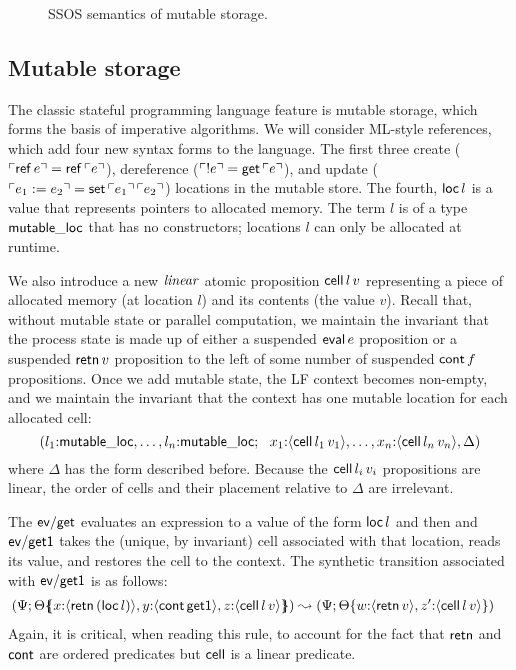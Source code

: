 \begin{figure}[t]
\caption{SSOS semantics of mutable storage.}
\label{fig:ssos-mutable}
\end{figure}

\subsection{Mutable storage}
\label{sec:mutable-storage}

The classic stateful programming language feature is mutable storage,
which forms the basis of imperative algorithms. We will consider
ML-style references, which add four new syntax forms to the language.
The first three create (${\ulcorner{{\sf ref}\,e}\urcorner} = {\sf
  ref}\,{\ulcorner{e}\urcorner}$), dereference (${\ulcorner{{!}e}\urcorner} = {\sf
  get}\,{\ulcorner{e}\urcorner}$), and update (${\ulcorner{e_1 := e_2}\urcorner} = {\sf
  set}\,{\ulcorner{e_1}\urcorner}\,{\ulcorner{e_2}\urcorner}$) locations in the mutable
store. The fourth, ${\sf loc}\,l$ is a value that represents pointers
to allocated memory. The term $l$ is of a type ${\sf mutable\_loc}$
that has no constructors; locations $l$ can only be allocated at
runtime.

We also introduce a new ${\it linear}$ atomic proposition ${\sf
  cell}\,l\,v$ representing a piece of allocated memory (at location
$l$) and its contents (the value $v$). Recall that, without mutable
state or parallel computation, we maintain the invariant that the
process state is made up of either a suspended ${\sf eval}\,e$
proposition or a suspended ${\sf retn}\,v$ proposition to the left of
some number of suspended ${\sf cont}\,f$ propositions. Once we add
mutable state, the LF context becomes non-empty, and we maintain the
invariant that the context has one mutable location for each allocated
cell:
\[
(l_1{:}{\sf mutable\_loc}, \ldots, l_n{:}{\sf mutable\_loc}; ~~
 x_1{:}\langle {{\sf cell}\,l_1\,v_1} \rangle, \ldots, 
 x_n{:}\langle {{\sf cell}\,l_n\,v_n} \rangle, 
 \Delta)
\]
where $\Delta$ has the form described before. Because the ${\sf
  cell}\,l_i\,v_i$ propositions are linear, the order of cells and
their placement relative to $\Delta$ are irrelevant.

The ${\sf ev/get}$ evaluates an expression
to a value of the form ${\sf loc}\,l$ and then 
and ${\sf ev/get1}$ takes the (unique, by invariant) cell associated
with that location, reads its value, and restores the cell to the
context. The synthetic transition associated with ${\sf ev/get1}$ is 
as follows:
\begin{align*}
(\Psi&;  {\Theta}\mbox{$\{\hspace{-4pt}\{$}{x{:}\langle {{\sf retn}\,({\sf loc}\,l)} \rangle, y{:}\langle {{\sf cont}\,{\sf get1}} \rangle, z{:}\langle {{\sf cell}\,l\,v} \rangle}\mbox{$\}\hspace{-4pt}\}$})
\leadsto 
(\Psi; {\Theta}\{{w{:}\langle {{\sf retn}\,v} \rangle,
z'{:}\langle {{\sf cell}\,l\,v} \rangle}\})
\end{align*}
Again, it is critical, when reading this rule, to account for the fact
that ${\sf retn}$ and ${\sf cont}$ are ordered predicates but ${\sf
  cell}$ is a linear predicate.

